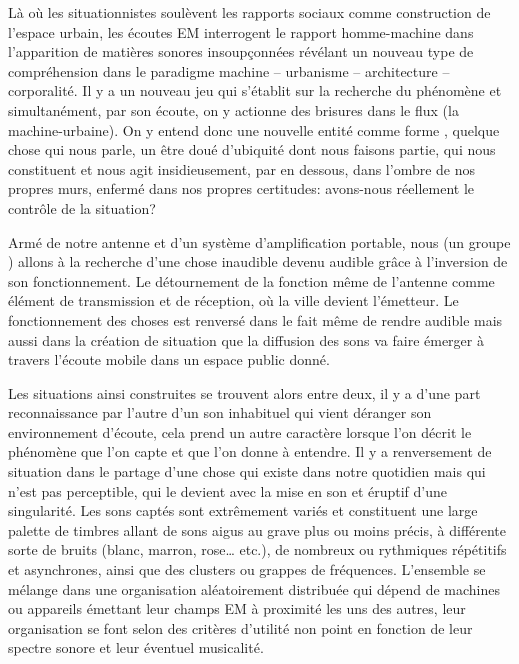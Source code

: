 {L\`a o\`u les situationnistes soul\`event les rapports sociaux comme
construction de l'espace urbain, les \'ecoutes EM
interrogent le rapport homme{}-machine dans
l'apparition de mati\`eres sonores insoup\c{c}onn\'ees
r\'ev\'elant un nouveau type de compr\'ehension dans le paradigme
machine {--} urbanisme {--} architecture {--} corporalit\'e. Il y a un
nouveau jeu qui s'\'etablit sur la recherche du
ph\'enom\`ene et simultan\'ement, par son \'ecoute, on y actionne des
brisures dans le flux (la machine{}-urbaine). On y entend donc une
nouvelle entit\'e comme forme , quelque chose qui nous parle,
un \^etre dou\'e d'ubiquit\'e dont nous faisons
partie, qui nous constituent et nous agit insidieusement, par en
dessous, dans l'ombre de nos propres murs, enferm\'e
dans nos propres certitudes: avons{}-nous r\'eellement le contr\^ole de
la situation?

Arm\'e de notre antenne et d'un syst\`eme
d'amplification portable, nous (un groupe
) allons \`a la recherche d'une chose
inaudible devenu audible gr\^ace \`a l'inversion de
son fonctionnement. Le d\'etournement de la fonction m\^eme de
l'antenne comme \'el\'ement de transmission et de
r\'eception, o\`u la ville devient l'\'emetteur. Le
fonctionnement des choses est renvers\'e dans le fait m\^eme de rendre
audible mais aussi dans la cr\'eation de situation que la diffusion des
sons va faire \'emerger \`a travers l'\'ecoute mobile
dans un espace public donn\'e.


Les situations ainsi construites se trouvent alors entre deux, il y a
d'une part reconnaissance par l'autre
d'un son inhabituel qui vient d\'eranger son
environnement d'\'ecoute, cela prend un autre
caract\`ere lorsque l'on d\'ecrit le ph\'enom\`ene que
l'on capte et que l'on donne \`a
entendre. Il y a renversement de situation dans le partage
d'une chose qui existe dans notre quotidien mais qui
n'est pas perceptible, qui le devient avec la mise en
son  et \'eruptif d'une singularit\'e. Les sons
capt\'es sont extr\^emement vari\'es et constituent une large palette
de timbres allant de sons aigus au grave plus ou moins pr\'ecis, \`a
diff\'erente sorte de bruits (blanc, marron, rose{\dots} etc.), de nombreux
{\em {}} ou rythmiques r\'ep\'etitifs et asynchrones, ainsi
que des clusters ou grappes de fr\'equences.
L'ensemble se m\'elange dans une organisation
al\'eatoirement distribu\'ee qui d\'epend de machines ou appareils
\'emettant leur champs EM \`a proximit\'e les uns des autres, leur
organisation se font selon des crit\`eres d'utilit\'e
non point en fonction de leur spectre sonore et leur \'eventuel
musicalit\'e.

}
